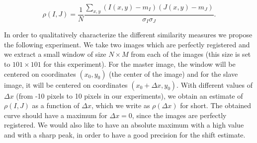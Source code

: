 \begin{equation}
\rho(I,J) = \frac{1}{N}\frac{\sum_{x,y}(I(x,y)-m_I)(J(x,y)-m_J)}{\sigma_I
\sigma_J}.
\label{coeffcorr}
\end{equation}

In order to qualitatively characterize the different similarity
measures we propose the following experiment. We take two images which
are perfectly registered and we extract a small window
of size $N\times M$ from each of the images (this size is set to
$101\times 101$ for this experiment). For the master image, the
window will be centered on coordinates $(x_0,
y_0)$ (the center of the image) and for the slave image, it will be centered on coordinates $(x_0+\Delta x,
y_0)$. With different values of $\Delta x$ (from -10 pixels to 10
pixels in our experiments), we obtain an estimate of $\rho(I,J)$ as a
function of $\Delta x$, which we write as
$\rho(\Delta x)$ for short. The obtained curve should have a maximum for
$\Delta x =0$, since the images are perfectly registered. We would
also like to have an absolute maximum with a high value and with a
sharp peak, in order to have a good precision for the shift estimate.\\




